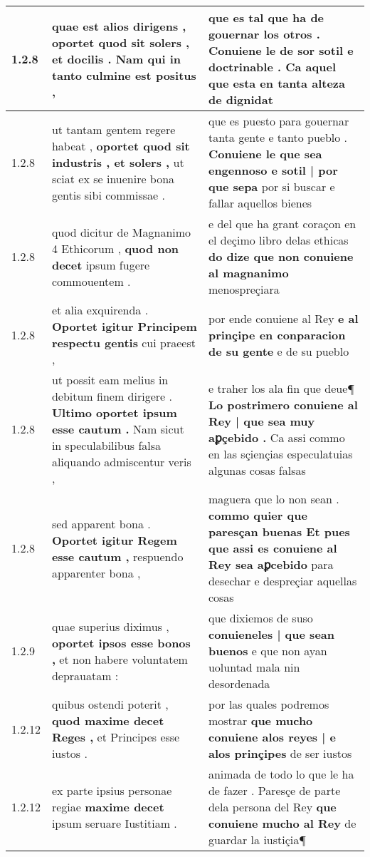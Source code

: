 \begin{tabular}{|p{1cm}|p{6.5cm}|p{6.5cm}|}
1.2.8 & quae est alios dirigens , \textbf{ oportet quod sit solers , et docilis . } Nam qui in tanto culmine est positus , & que es tal que ha de gouernar los otros . \textbf{ Conuiene le de sor sotil e doctrinable . } Ca aquel que esta en tanta alteza de dignidat \\\hline
1.2.8 & ut tantam gentem regere habeat , \textbf{ oportet quod sit industris , et solers , } ut sciat ex se inuenire bona gentis sibi commissae . & que es puesto para gouernar tanta gente e tanto pueblo . \textbf{ Conuiene le que sea engennoso e sotil | por que sepa } por si buscar e fallar aquellos bienes \\\hline
1.2.8 & quod dicitur de Magnanimo 4 Ethicorum , \textbf{ quod non decet } ipsum fugere commouentem . & e del que ha grant coraçon en el deçimo libro delas ethicas \textbf{ do dize que non conuiene al magnanimo } menospreçiara \\\hline
1.2.8 & et alia exquirenda . \textbf{ Oportet igitur Principem respectu gentis } cui praeest , & por ende conuiene al Rey \textbf{ e al prinçipe en conparacion de su gente } e de su pueblo \\\hline
1.2.8 & ut possit eam melius in debitum finem dirigere . \textbf{ Ultimo oportet ipsum esse cautum . } Nam sicut in speculabilibus falsa aliquando admiscentur veris , & e traher los ala fin que deue¶ \textbf{ Lo postrimero conuiene al Rey | que sea muy aꝑçebido . } Ca assi commo en las sçiençias especulatuias algunas cosas falsas \\\hline
1.2.8 & sed apparent bona . \textbf{ Oportet igitur Regem esse cautum , } respuendo apparenter bona , & maguera que lo non sean . \textbf{ commo quier que paresçan buenas Et pues que assi es conuiene al Rey sea aꝑcebido } para desechar e despreçiar aquellas cosas \\\hline
1.2.9 & quae superius diximus , \textbf{ oportet ipsos esse bonos , } et non habere voluntatem deprauatam : & que dixiemos de suso \textbf{ conuieneles | que sean buenos } e que non ayan uoluntad mala nin desordenada \\\hline
1.2.12 & quibus ostendi poterit , \textbf{ quod maxime decet Reges , } et Principes esse iustos . & por las quales podremos mostrar \textbf{ que mucho conuiene alos reyes | e alos prinçipes } de ser iustos \\\hline
1.2.12 & ex parte ipsius personae regiae \textbf{ maxime decet } ipsum seruare Iustitiam . & animada de todo lo que le ha de fazer . Paresçe de parte dela persona del Rey \textbf{ que conuiene mucho al Rey } de guardar la iustiçia¶ \\\hline

\end{tabular}
